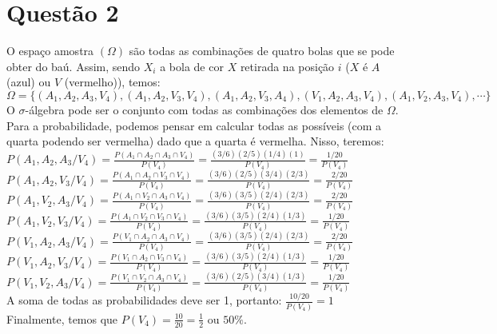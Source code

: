 \documentclass{article}
\begin{document}
\section*{Questão 2}
O espaço amostra $(\Omega)$ são todas as combinações de quatro bolas que se pode obter do baú. Assim, sendo $X_{i}$ a bola de cor $X$ retirada na posição $i$ ($X$ é $A$ (azul) ou $V$ (vermelho)), temos:
\vspace{\baselineskip}
\[\Omega = \{(A_{1}, A_{2}, A_{3}, V_{4}), 
(A_{1}, A_{2}, V_{3}, V_{4}),
(A_{1}, A_{2}, V_{3}, A_{4}),
(V_{1}, A_{2}, A_{3}, V_{4}),
(A_{1}, V_{2}, A_{3}, V_{4}),
\cdots
\}\]
O $\sigma$-álgebra pode ser o conjunto com todas as combinações dos elementos de $\Omega$.\\
Para a probabilidade, podemos pensar em calcular todas as possíveis (com a quarta podendo ser vermelha) dado que a quarta é vermelha. Nisso, teremos:
\vspace{\baselineskip}\\
$P(A_{1}, A_{2}, A_{3}/V_{4}) = \frac{P(A_{1} \cap A_{2} \cap A_{3} \cap V_{4})}{P(V_{4})} = \frac{(3/6) (2/5) (1/4) (1)}{P(V_{4})} = \frac{1/20}{P(V_{4})}$
\vspace{\baselineskip}\\
$P(A_{1}, A_{2}, V_{3}/V_{4}) = \frac{P(A_{1} \cap A_{2} \cap V_{3} \cap V_{4})}{P(V_{4})} = \frac{(3/6) (2/5) (3/4) (2/3)}{P(V_{4})} = \frac{2/20}{P(V_{4})}$
\vspace{\baselineskip}\\
$P(A_{1}, V_{2}, A_{3}/V_{4}) = \frac{P(A_{1} \cap V_{2} \cap A_{3} \cap V_{4})}{P(V_{4})} = \frac{(3/6) (3/5) (2/4) (2/3)}{P(V_{4})} = \frac{2/20}{P(V_{4})}$
\vspace{\baselineskip}\\
$P(A_{1}, V_{2}, V_{3}/V_{4}) = \frac{P(A_{1} \cap V_{2} \cap V_{3} \cap V_{4})}{P(V_{4})} = \frac{(3/6) (3/5) (2/4) (1/3)}{P(V_{4})} = \frac{1/20}{P(V_{4})}$
\vspace{\baselineskip}\\
$P(V_{1}, A_{2}, A_{3}/V_{4}) = \frac{P(V_{1} \cap A_{2} \cap A_{3} \cap V_{4})}{P(V_{4})} = \frac{(3/6) (3/5) (2/4) (2/3)}{P(V_{4})} = \frac{2/20}{P(V_{4})}$
\vspace{\baselineskip}\\
$P(V_{1}, A_{2}, V_{3}/V_{4}) = \frac{P(V_{1} \cap A_{2} \cap V_{3} \cap V_{4})}{P(V_{4})} = \frac{(3/6) (3/5) (2/4) (1/3)}{P(V_{4})} = \frac{1/20}{P(V_{4})}$
\vspace{\baselineskip}\\
$P(V_{1}, V_{2}, A_{3}/V_{4}) = \frac{P(V_{1} \cap V_{2} \cap A_{3} \cap V_{4})}{P(V_{4})} = \frac{(3/6) (2/5) (3/4) (1/3)}{P(V_{4})} = \frac{1/20}{P(V_{4})}$
\vspace{\baselineskip}\\
A soma de todas as probabilidades deve ser 1, portanto:
$\frac{10/20}{P(V_{4})} = 1$
\vspace{\baselineskip}\\
Finalmente, temos que $P(V_{4}) = \frac{10}{20} = \frac{1}{2}$ ou $50\%$.
\end{document}
